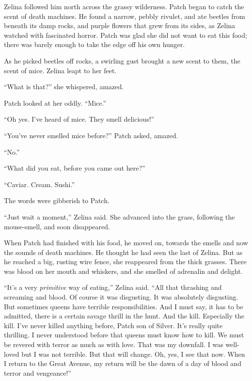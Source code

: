 \documentclass[ebook,oneside,openany,17pt]{memoir}
\newenvironment{tolerant}[1]{%
  \par\tolerance=#1\relax
}{%
  \par
}
\begin{document}
\begin{tolerant}{500}
Zelina followed him north across the grassy wilderness. Patch began to
catch the scent of death machines. He found a narrow, pebbly rivulet,
and ate beetles from beneath its damp rocks, and purple flowers that
grew from its sides, as Zelina watched with fascinated horror. Patch
was glad she did not want to eat this food; there was barely enough to
take the edge off his own hunger.
\end{tolerant}

As he picked beetles off rocks, a swirling gust brought a new scent to
them, the scent of mice. Zelina leapt to her feet.

“What is that?” she whispered, amazed.

Patch looked at her oddly. “Mice.”

“Oh yes. I’ve heard of mice. They smell delicious!”

“You’ve never smelled mice before?” Patch asked, amazed.

“No.”

“What did you eat, before you came out here?”

“Caviar. Cream. Sushi.”

The words were gibberish to Patch.

“Just wait a moment,” Zelina said. She advanced into the grass,
following the mouse-smell, and soon disappeared.

\begin{tolerant}{1000}
When Patch had finished with his food, he moved on, towards the smells
and now the sounds of death machines. He thought he had seen the last
of Zelina. But as he reached a big, rusting wire fence, she reappeared
from the thick grasses. There was blood on her mouth and whiskers, and
she smelled of adrenalin and delight.
\end{tolerant}

\begin{tolerant}{1000}
“It’s a very \emph{primitive} way of eating,” Zelina said. “All that
thrashing and screaming and blood. Of course it was disgusting. It was
absolutely disgusting. But sometimes queens have terrible
responsibilities. And I must say, it has to be admitted, there is a
certain savage thrill in the hunt. And the kill. Especially the
kill. I’ve never killed anything before, Patch son of Silver. It’s
really quite thrilling. I never understood before that queens must
know how to kill. We must be revered with terror as much as with
love. That was my downfall. I was well-loved but I was not
terrible. But that will change. Oh, yes, I see that now. When I return
to the Great Avenue, my return will be the dawn of a day of blood and
terror and vengeance!”
\end{tolerant}
\end{document}
